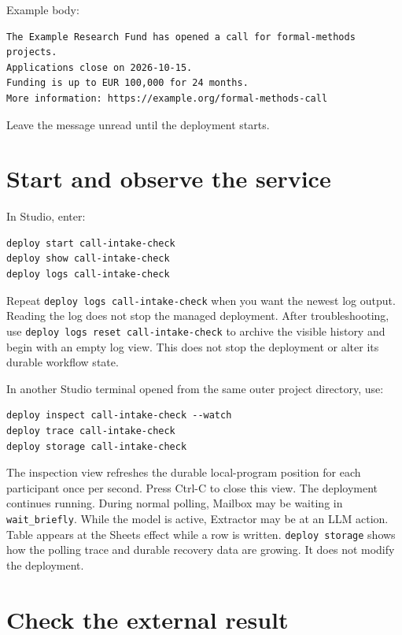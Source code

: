 \documentclass[11pt,a4paper]{article}
\begin{document}
Example body:

\begin{lstlisting}
The Example Research Fund has opened a call for formal-methods projects.
Applications close on 2026-10-15.
Funding is up to EUR 100,000 for 24 months.
More information: https://example.org/formal-methods-call
\end{lstlisting}

Leave the message unread until the deployment starts.

\section{Start and observe the service}

In Studio, enter:

\begin{lstlisting}[style=shell]
deploy start call-intake-check
deploy show call-intake-check
deploy logs call-intake-check
\end{lstlisting}

Repeat \texttt{deploy logs call-intake-check} when you want the newest log
output. Reading the log does not stop the managed deployment.
After troubleshooting, use
\texttt{deploy logs reset call-intake-check} to archive the visible history
and begin with an empty log view. This does not stop the deployment or alter
its durable workflow state.

In another Studio terminal opened from the same outer project directory, use:

\begin{lstlisting}[style=shell]
deploy inspect call-intake-check --watch
deploy trace call-intake-check
deploy storage call-intake-check
\end{lstlisting}

The inspection view refreshes the durable local-program position for each
participant once per second. Press Ctrl-C to close this view. The deployment
continues running. During normal polling, Mailbox may be waiting in
\texttt{wait\_briefly}. While the model is active, Extractor may be at an LLM
action. Table appears at the Sheets effect while a row is written.
\texttt{deploy storage} shows how the polling trace and durable recovery data
are growing. It does not modify the deployment.

\section{Check the external result}
\end{document}
